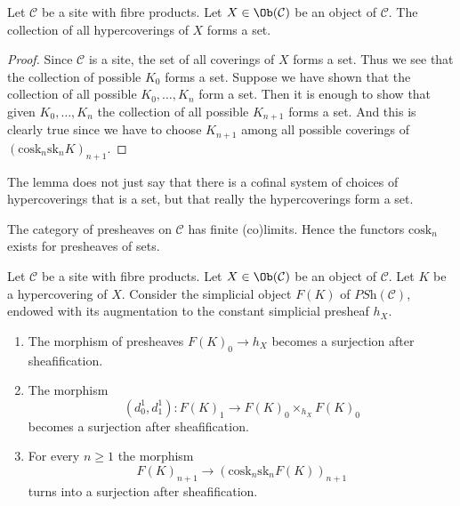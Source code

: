 \begin{lemma}
\label{lemma-hypercoverings-set}
Let $\mathcal{C}$ be a site with fibre products.
Let $X \in \Ob(\mathcal{C})$ be an object of $\mathcal{C}$.
The collection of all hypercoverings of $X$ forms a set.
\end{lemma}

\begin{proof}
Since $\mathcal{C}$ is a site, the set of all coverings of
$X$ forms a set. Thus we see that the collection
of possible $K_0$ forms a set. Suppose we have shown that
the collection of all possible $K_0, \ldots, K_n$ form
a set. Then it is enough to show that given
$K_0, \ldots, K_n$ the collection of all possible
$K_{n + 1}$ forms a set. And this is clearly true since
we have to choose $K_{n + 1}$ among all possible coverings
of $(\text{cosk}_n \text{sk}_n K)_{n + 1}$.
\end{proof}

\begin{remark}
\label{remark-hypercoverings-really-set}
The lemma does not just say that there is a cofinal
system of choices of hypercoverings that is a set,
but that really the hypercoverings form a set.
\end{remark}

\noindent
The category of presheaves on $\mathcal{C}$ has
finite (co)limits. Hence the functors $\text{cosk}_n$
exists for presheaves of sets.

\begin{lemma}
\label{lemma-hypercovering-F}
Let $\mathcal{C}$ be a site with fibre products.
Let $X \in \Ob(\mathcal{C})$ be an object of $\mathcal{C}$.
Let $K$ be a hypercovering of $X$.
Consider the simplicial object $F(K)$ of $\textit{PSh}(\mathcal{C})$,
endowed with its augmentation to the constant simplicial presheaf $h_X$.
\begin{enumerate}
\item The morphism of presheaves $F(K)_0 \to h_X$ becomes
a surjection after sheafification.
\item The morphism
$$
(d^1_0, d^1_1) :
F(K)_1
\longrightarrow
F(K)_0 \times_{h_X} F(K)_0
$$
becomes a surjection after sheafification.
\item For every $n \geq 1$ the morphism
$$
F(K)_{n + 1} \longrightarrow (\text{cosk}_n \text{sk}_n F(K))_{n + 1}
$$
turns into a surjection after sheafification.
\end{enumerate}
\end{lemma}

